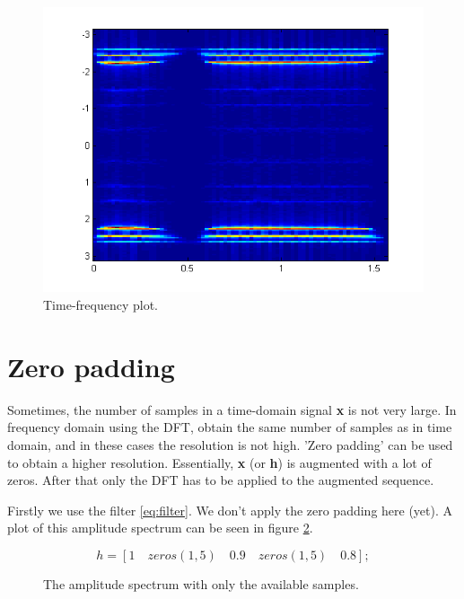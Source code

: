 \documentclass[final]{scrreprt} %
\begin{document}
\begin{figure}[h]
\centering
\includegraphics[scale = 0.5]{resources/labday1/timefrequentieplot.png}
\caption{Time-frequency plot.}
\label{fig:timefreq}
\end{figure}



\section{Zero padding}
Sometimes, the number of samples in a time-domain signal \textbf{x} is not very large. 
In frequency domain using the DFT, obtain the same number of samples as in time domain, and in these cases the resolution is not high.
'Zero padding' can be used to obtain a higher resolution.
Essentially, \textbf{x} (or \textbf{h}) is augmented with a lot of zeros.
After that only the DFT has to be applied to the augmented sequence. 

Firstly we use the filter \ref{eq:filter}. 
We don't apply the zero padding here (yet). 
A plot of this amplitude spectrum can be seen in figure \ref{fig:zeropadding1}.

\begin{equation}
h = [1\quad zeros(1,5)\quad 0.9\quad zeros(1,5)\quad 0.8];
\label{eq:filter}
\end{equation}

\begin{figure}[H]
	\centering
	\setlength\figureheight{6cm}
  	\setlength\figurewidth{10cm}
	
	\caption{The amplitude spectrum with only the available samples.}
	\label{fig:zeropadding1}
\end{figure}
\end{document}
